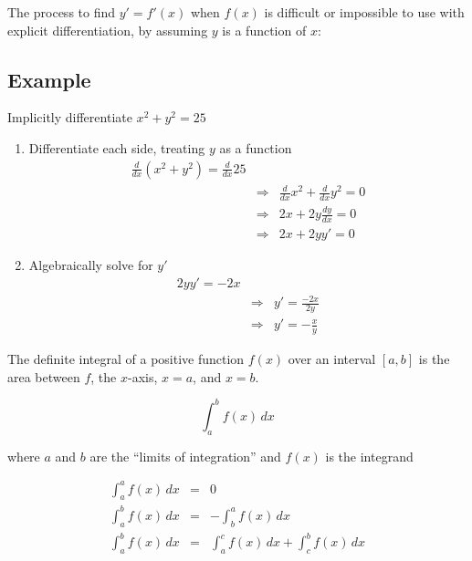 
The process to find $y' = f'(x)$ when $f(x)$ is difficult or impossible to use with explicit differentiation, by assuming $y$ is a function of $x$:

\subsection*{Example}

Implicitly differentiate $x^2 + y^2 = 25$

\begin{enumerate}
    \item Differentiate each side, treating $y$ as a function
    \begin{eqnarray}
        \frac{d}{dx} \left( x^2 + y^2 \right) = \frac{d}{dx} 25 \\
        &\Rightarrow& \frac{d}{dx} x^2 + \frac{d}{dx} y^2 = 0 \\
        &\Rightarrow& 2x + 2y \frac{dy}{dx} = 0 \\
        &\Rightarrow& 2x + 2yy' = 0
    \end{eqnarray}
    
    \item Algebraically solve for $y'$
    \begin{eqnarray}
    	2yy' = -2x \\
	    &\Rightarrow& y' = \frac{-2x}{2y} \\
	    &\Rightarrow& y' = -\frac{x}{y}    
    \end{eqnarray}
\end{enumerate}
\hformbar




The definite integral of a positive function $f(x)$ over an interval $[a, b]$ is the area between $f$, the $x$-axis, $x = a$, and $x = b$.

\begin{equation}
    \int_a^b f(x)\, dx
\end{equation}

where $a$ and $b$ are the ``limits of integration'' and $f(x)$ is the integrand

    \begin{eqnarray}
        \int_a^a f(x)\, dx &=& 0                   \\
        \int_a^b f(x)\, dx &=& -\int_b^a f(x)\, dx  \\
        \int_a^b f(x)\, dx &=& \int_a^c f(x)\, dx + \int_c^b f(x)\, dx
    \end{eqnarray}

